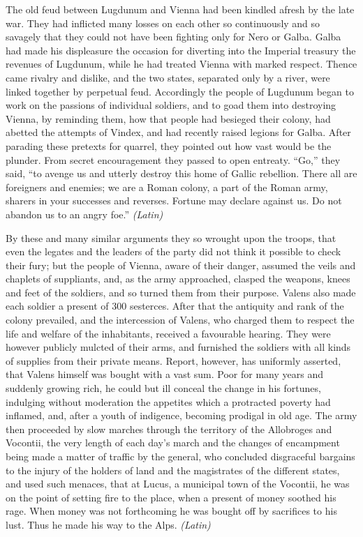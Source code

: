 
The old feud between Lugdunum and Vienna had been kindled afresh by the late war. They had inflicted many losses on each other so continuously and so savagely that they could not have been fighting only for Nero or Galba. Galba had made his displeasure the occasion for diverting into the Imperial treasury the revenues of Lugdunum, while he had treated Vienna with marked respect. Thence came rivalry and dislike, and the two states, separated only by a river, were linked together by perpetual feud. Accordingly the people of Lugdunum began to work on the passions of individual soldiers, and to goad them into destroying Vienna, by reminding them, how that people had besieged their colony, had abetted the attempts of Vindex, and had recently raised legions for Galba. After parading these pretexts for quarrel, they pointed out how vast would be the plunder. From secret encouragement they passed to open entreaty. ``Go,'' they said, ``to avenge us and utterly destroy this home of Gallic rebellion. There all are foreigners and enemies; we are a Roman colony, a part of the Roman army, sharers in your successes and reverses. Fortune may declare against us. Do not abandon us to an angry foe.'' \emph{(Latin)}


By these and many similar arguments they so wrought upon the troops, that even the legates and the leaders of the party did not think it possible to check their fury; but the people of Vienna, aware of their danger, assumed the veils and chaplets of suppliants, and, as the army approached, clasped the weapons, knees and feet of the soldiers, and so turned them from their purpose. Valens also made each soldier a present of 300 sesterces. After that the antiquity and rank of the colony prevailed, and the intercession of Valens, who charged them to respect the life and welfare of the inhabitants, received a favourable hearing. They were however publicly mulcted of their arms, and furnished the soldiers with all kinds of supplies from their private means. Report, however, has uniformly asserted, that Valens himself was bought with a vast sum. Poor for many years and suddenly growing rich, he could but ill conceal the change in his fortunes, indulging without moderation the appetites which a protracted poverty had inflamed, and, after a youth of indigence, becoming prodigal in old age. The army then proceeded by slow marches through the territory of the Allobroges and Vocontii, the very length of each day's march and the changes of encampment being made a matter of traffic by the general, who concluded disgraceful bargains to the injury of the holders of land and the magistrates of the different states, and used such menaces, that at Lucus, a municipal town of the Vocontii, he was on the point of setting fire to the place, when a present of money soothed his rage. When money was not forthcoming he was bought off by sacrifices to his lust. Thus he made his way to the Alps. \emph{(Latin)}

